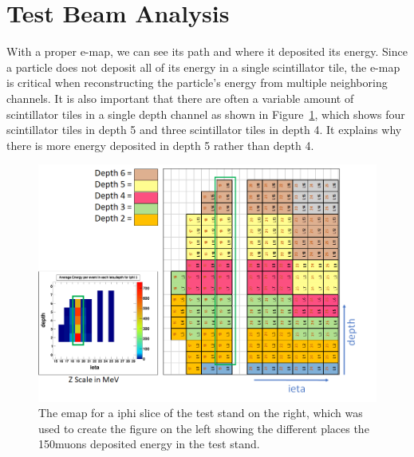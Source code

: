 \section{Test Beam Analysis}

With a proper e-map, we can see its path and where it deposited its energy. Since a particle does not deposit all of its energy in a single scintillator tile, the e-map is critical when reconstructing the particle's energy from multiple neighboring channels. It is also important that there are often a variable amount of scintillator tiles in a single depth channel as shown in Figure~\ref{fig:emap}, which shows four scintillator tiles in depth 5 and three scintillator tiles in depth 4. It explains why there is more energy deposited in depth 5 rather than depth 4. 

\begin{figure}
\centering
\includegraphics[width=\linewidth]{Figures/eplot.png}
\caption{The emap for a iphi slice of the test stand on the right, which was used to create the figure on the left showing the different places the 150\GeV\space muons deposited energy in the test stand.}
\label{fig:emap}
\end{figure}

